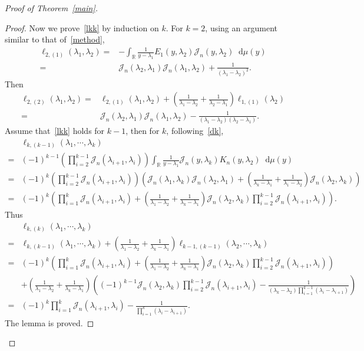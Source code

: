 \documentclass[a4paper]{article}
\theoremstyle{plain}
\theoremstyle{definition}
\newcommand{\dif}{\mathop{}\!\mathrm{d}}
\newcommand{\RR}{\mathbb{R}}
\newcommand{\nn}{\nonumber}
\begin{document}
\begin{proof}[Proof of Theorem~\ref{main}]
\begin{proof}
	Now we prove~\eqref{lkk} by induction on $k$. For $k=2$, using an argument similar to that of~\eqref{method},
	\begin{align}
		\ell_{2,(1)}(\lambda_1,\lambda_2)=&-\int_\RR\frac{1}{y-\lambda_1}E_1(y,\lambda_2)\mathcal J_n(y,\lambda_2)\dif\mu(y)\nn\\
		=&\mathcal J_n(\lambda_2,\lambda_1)\mathcal J_n(\lambda_1,\lambda_2)+\frac{1}{(\lambda_1-\lambda_2)^2}.
	\end{align}
	Then
	\begin{align}
		\ell_{2,(2)}(\lambda_1,\lambda_2)=&\ell_{2,(1)}(\lambda_1,\lambda_2)+\left(\frac{1}{\lambda_1-\lambda_2}+\frac{1}{\lambda_2-\lambda_1}\right)\ell_{1,(1)}(\lambda_2)\nn\\
		=&\mathcal J_n(\lambda_2,\lambda_1)\mathcal J_n(\lambda_1,\lambda_2)-\frac{1}{(\lambda_1-\lambda_2)(\lambda_2-\lambda_1)}.
	\end{align} 
	Assume that~\eqref{lkk} holds for $k-1$, then for $k$, following~\eqref{dk},
	\begin{align}
		&\ell_{k,(k-1)}(\lambda_1,\cdots,\lambda_k)\nn\\
		=&(-1)^{k-1}\left(\prod_{i=2}^{k-1}\mathcal J_n(\lambda_{i+1},\lambda_i)\right)\int_\RR\frac{1}{y-\lambda_1}\mathcal J_n(y,\lambda_k)K_n(y,\lambda_2)\dif\mu(y)\nn\\
		=&(-1)^k\left(\prod_{i=2}^{k-1}\mathcal J_n(\lambda_{i+1},\lambda_i)\right)\left(\mathcal J_n(\lambda_1,\lambda_k)\mathcal J_n(\lambda_2,\lambda_1)+\left(\frac{1}{\lambda_k-\lambda_1}+\frac{1}{\lambda_1-\lambda_2}\right)\mathcal J_n(\lambda_2,\lambda_k)\right)\nn\\
		=&(-1)^k\left(\prod_{i=1}^k\mathcal J_n(\lambda_{i+1},\lambda_i)+\left(\frac{1}{\lambda_1-\lambda_2}+\frac{1}{\lambda_k-\lambda_1}\right)\mathcal J_n(\lambda_2,\lambda_k)\prod_{i=2}^{k-1}\mathcal J_n(\lambda_{i+1},\lambda_i)\right).
	\end{align} 
	Thus
	\begin{align}
		&\ell_{k,(k)}(\lambda_1,\cdots,\lambda_k)\nn\\
		=&\ell_{k,(k-1)}(\lambda_1,\cdots,\lambda_k)+\left(\frac{1}{\lambda_1-\lambda_2}+\frac{1}{\lambda_k-\lambda_1}\right)\ell_{k-1,(k-1)}(\lambda_2,\cdots,\lambda_k)\nn\\
		=&(-1)^k\left(\prod_{i=1}^k\mathcal J_n(\lambda_{i+1},\lambda_i)+\left(\frac{1}{\lambda_1-\lambda_2}+\frac{1}{\lambda_k-\lambda_1}\right)\mathcal J_n(\lambda_2,\lambda_k)\prod_{i=2}^{k-1}\mathcal J_n(\lambda_{i+1},\lambda_i)\right)\nn\\
		&+\left(\frac{1}{\lambda_1-\lambda_2}+\frac{1}{\lambda_k-\lambda_1}\right)\left((-1)^{k-1}\mathcal J_n(\lambda_2,\lambda_k)\prod_{i=2}^{k-1}\mathcal J_n(\lambda_{i+1},\lambda_i)-\frac{1}{(\lambda_k-\lambda_2)\prod_{i=1}^{k-1}(\lambda_i-\lambda_{i+1})}\right)\nn\\
		=&(-1)^k\prod_{i=1}^k\mathcal J_n(\lambda_{i+1},\lambda_i)-\frac{1}{\prod_{i=1}^k(\lambda_i-\lambda_{i+1})}.
	\end{align}
	The lemma is proved.
\end{proof}


\end{proof}
\end{document}
